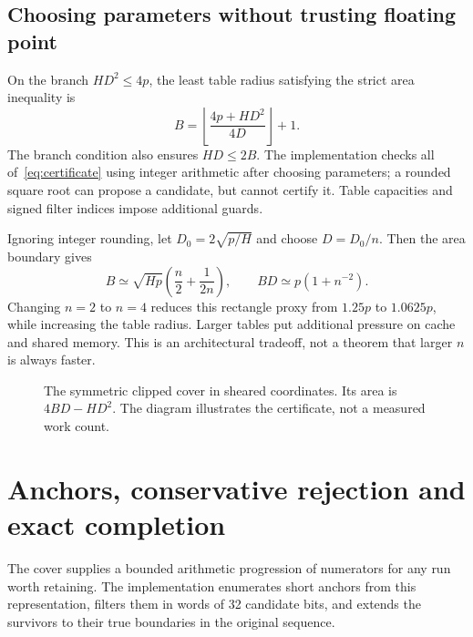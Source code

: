 \documentclass[11pt]{article}
\theoremstyle{definition}\newtheorem{remark}[theorem]{Remark}
\begin{document}
\subsection{Choosing parameters without trusting floating point}
On the branch $HD^2\le4p$, the least table radius satisfying the strict
area inequality is
\begin{equation}\label{eq:Bchoice}
 B=\left\lfloor\frac{4p+HD^2}{4D}\right\rfloor+1.
\end{equation}
The branch condition also ensures $HD\le2B$. The implementation checks all
of~\eqref{eq:certificate} using integer arithmetic after choosing parameters;
a rounded square root can propose a candidate, but cannot certify it.
Table capacities and signed filter indices impose additional guards.

Ignoring integer rounding, let $D_0=2\sqrt{p/H}$ and choose $D=D_0/n$.
Then the area boundary gives
\begin{equation}\label{eq:volume}
 B\simeq\sqrt{Hp}\left(\frac n2+\frac1{2n}\right),\qquad
 BD\simeq p(1+n^{-2}).
\end{equation}
Changing $n=2$ to $n=4$ reduces this rectangle proxy from $1.25p$ to
$1.0625p$, while increasing the table radius. Larger tables put additional
pressure on cache and shared memory. This is an architectural tradeoff,
not a theorem that larger $n$ is always faster.

\begin{figure}[ht]
\centering
{}
\caption{The symmetric clipped cover in sheared coordinates. Its area is
$4BD-HD^2$. The diagram illustrates the certificate, not a measured work count.}
\label{fig:cover}
\end{figure}

\section{Anchors, conservative rejection and exact completion}\label{sec:anchors}
The cover supplies a bounded arithmetic progression of numerators for any
run worth retaining. The implementation enumerates short anchors from this
representation, filters them in words of 32 candidate bits, and extends the
survivors to their true boundaries in the original sequence.
\end{document}
